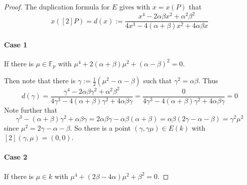 \documentclass{scrartcl}
\newcommand{\F}{\mathbb{F}}
\theoremstyle{definition}
\begin{document}
\begin{proof}
    The duplication formula for $E$ gives with $x = x(P)$ that
    \begin{equation*}
        x([2]P) = d(x) := \frac {x^4 - 2 \alpha \beta x^2 + \alpha^2 \beta^2} {4x^3 - 4(\alpha + \beta) x^2 + 4 \alpha \beta x}
    \end{equation*}

    \paragraph{Case 1} If there is $\mu \in \F_p$ with $\mu^4 + 2(\alpha + \beta)\mu^2 + (\alpha - \beta)^2 = 0$.

    Then note that there is $\gamma := \frac 1 2 (\mu^2 - \alpha - \beta)$ such that $\gamma^2 = \alpha\beta$.
    Thus
    \begin{equation*}
        d(\gamma) = \frac {\gamma^4 - 2\alpha\beta\gamma^2 + \alpha^2\beta^2} {4\gamma^3 - 4(\alpha + \beta) \gamma^2 + 4 \alpha \beta \gamma} = \frac 0 {4\gamma^3 - 4(\alpha + \beta) \gamma^2 + 4 \alpha \beta \gamma} = 0
    \end{equation*}
    Note further that
    \begin{equation*}
        \gamma^3 - (\alpha + \beta)\gamma^2 + \alpha\beta\gamma = 2\alpha\beta\gamma - \alpha\beta(\alpha + \beta) = \alpha\beta(2\gamma - \alpha - \beta) = \gamma^2 \mu^2
    \end{equation*}
    since $\mu^2 = 2\gamma - \alpha - \beta$.
    So there is a point $(\gamma, \gamma\mu) \in E(k)$ with $[2](\gamma, \mu) = (0, 0)$.

    \paragraph{Case 2} If there is $\mu \in k$ with $\mu^4 + (2\beta - 4\alpha)\mu^2 + \beta^2 = 0$.


\end{proof}
\end{document}
